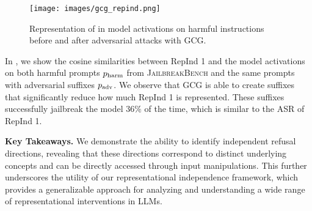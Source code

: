 \begin{wrapfigure}[14]{l}{0.5\linewidth}
    \vspace{-8pt}
    \texttt{[image: images/gcg\_repind.png]}
    \vspace{-25pt}
    \caption{Representation of  in model activations on harmful instructions before and after adversarial attacks with GCG.}
    \label{fig:input_manipulation}
\end{wrapfigure}
In , we show the cosine similarities between RepInd 1 and the model activations on both harmful prompts ${{p}_{\text{harm}}}$ from \textsc{JailbreakBench} and the same prompts with adversarial suffixes ${p}_{\text{adv}}$. We observe that GCG is able to create suffixes that significantly reduce how much RepInd 1 is represented. These suffixes successfully jailbreak the model $36\%$ of the time, which is similar to the ASR of RepInd 1. 

\begin{mybox}
    \textbf{Key Takeaways.} We demonstrate the ability to identify independent refusal directions, revealing that these directions correspond to distinct underlying concepts and can be directly accessed through input manipulations. This further underscores the utility of our representational independence framework, which provides a generalizable approach for analyzing and understanding a wide range of representational interventions in LLMs.
\end{mybox}
